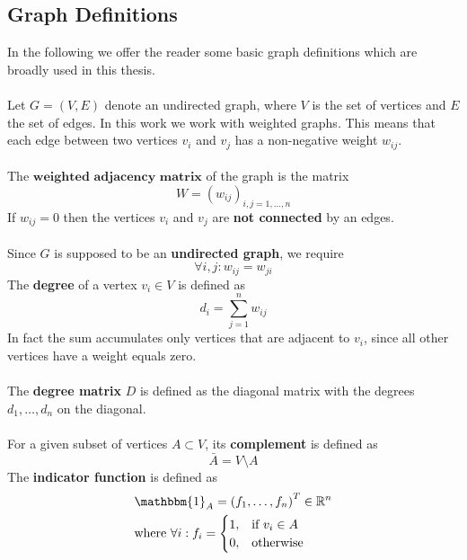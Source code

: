 \subsection{Graph Definitions}
In the following we offer the reader some basic graph definitions which are broadly used in this thesis. \\ \\ 
Let $G = (V, E)$ denote an undirected graph, where $V$ is the set of vertices and $E$ the set of edges. In this work we work with weighted graphs. This means that each edge between two vertices $v_i$ and $v_j$ has a non-negative weight $w_{ij}$. \\ \\
The $\textbf{weighted adjacency matrix}$ of the graph is the matrix 
\begin{equation}
W = \left( w_{ij} \right)_{i,j=1,\dots, n}
\label{eq:def_adjacency_matrix}
\end{equation}
If $w_{ij} = 0$ then the vertices $v_i$ and $v_j$ are \textbf{not connected} by an edges. \\ \\
Since $G$ is supposed to be an \textbf{undirected graph}, we require
\begin{equation}
	\forall i,j : w_{ij} = w_{ji}
\end{equation}
The \textbf{degree} of a vertex $v_i \in V$ is defined as
\begin{equation}
	d_i = \sum_{j=1}^n w_{ij}
\label{eq:vertex_degree}
\end{equation}
In fact the sum accumulates only vertices that are adjacent to $v_i$, since all other vertices have a weight equals zero. \\ \\
The \textbf{degree matrix} $D$ is defined as the diagonal matrix with the degrees $d_1,\dots, d_n$ on the diagonal. \\ \\
For a given subset of vertices $A \subset V$, its \textbf{complement} is defined as
\begin{equation}
	\bar{A} = V \setminus A
\label{eq:set_complement}
\end{equation}
The \textbf{indicator function} is defined as
\begin{equation}
\begin{aligned}
& \mathbbm{1}_A = \left( f_1, \dots, f_n \right)^{T} \in \mathbb{R}^n \\
& \text{where } \forall i: f_i= 
\begin{cases}
    1,& \text{if } v_i\in A\\
    0,              & \text{otherwise}
\end{cases}
\end{aligned}
\end{equation}
